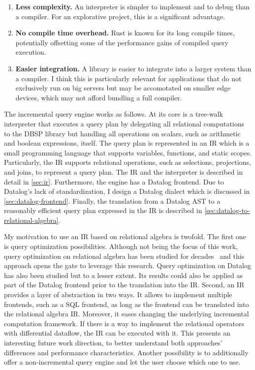 \begin{enumerate}
	\item \textbf{Less complexity.}
	      An interpreter is simpler to implement and to debug than a compiler.
	      For an explorative project, this is a significant advantage.
	\item \textbf{No compile time overhead.}
	      Rust is known for its long compile times, potentially offsetting some
	      of the performance gains of compiled query execution.
	\item \textbf{Easier integration.}
	      A library is easier to integrate into a larger system than a compiler.
	      I think this is particularly relevant for applications that do not
	      exclusively run on big servers but may be accomotated on smaller
	      edge devices, which may not afford bundling a full compiler.
\end{enumerate}

The incremental query engine works as follows.
At its core is a tree-walk interpreter that executes a query plan by delegating
all relational computations to the DBSP library but handling all operations
on scalars, such as arithmetic and boolean expressions, itself.
The query plan is represented in an \acf{IR} which is a small programming
language that supports variables, functions, and static scopes.
Particularly, the \ac{IR} supports relational operations,
such as selections, projections, and joins, to represent a query plan.
The \ac{IR} and the interpreter is described in detail in \ref{sec:ir}.
Furthermore, the engine has a Datalog frontend.
Due to Datalog's lack of standardization, I design a Datalog dialect which is
discussed in \ref{sec:datalog-frontend}.
Finally, the translation from a Datalog \ac{AST} to a reasonably efficient
query plan expressed in the \ac{IR} is described
in \ref{sec:datalog-to-relational-algebra}.

My motivation to use an \ac{IR} based on relational algebra is twofold.
The first one is query optimization possibilities.
Although not being the focus of this work, query optimization on relational
algebra has been studied for decades~\cite{selinger1979access} and this approach
opens the gate to leverage this research.
Query optimization on Datalog has also been studied but to a lesser extent.
Its results could also be applied as part of the Datalog frontend prior to the
translation into the \ac{IR}.
Second, an \ac{IR} provides a layer of abstraction in two ways.
It allows to implement multiple frontends, such as a SQL frontend, as long as
the frontend can be translated into the relational algebra \ac{IR}.
Moreover, it eases changing the underlying incremental computation framework.
If there is a way to implement the relational operators with differential
dataflow, the \ac{IR} can be executed with it.
This presents an interesting future work direction, to better understand
both approaches' differences and performance characteristics.
Another possibility is to additionally offer a non-incremental query engine
and let the user choose which one to use.

